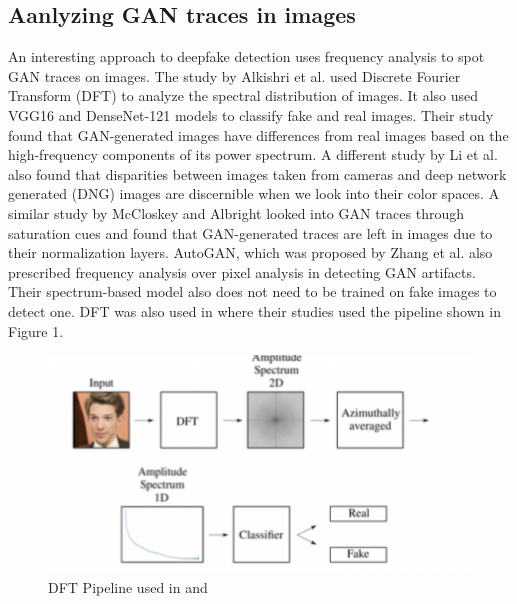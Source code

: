 \documentclass[journal]{./IEEE/IEEEtran}
\begin{document}
\subsection{Aanlyzing GAN traces in images}
An interesting approach to deepfake detection uses frequency analysis to spot GAN traces on images. The study by Alkishri et al. \cite{deepfake-fourier-cnn} used Discrete Fourier Transform (DFT) to analyze the spectral distribution of images. It also used VGG16 and DenseNet-121 models to classify fake and real images. Their study found that GAN-generated images have differences from real images based on the high-frequency components of its power spectrum. A different study by Li et al. \cite{dnn-color-components} also found that disparities between images taken from cameras and deep network generated (DNG) images are discernible when we look into their color spaces. A similar study by McCloskey and Albright \cite{gan-saturation} looked into GAN traces through saturation cues and found that GAN-generated traces are left in images due to their normalization layers. AutoGAN, which was proposed by Zhang et al.\cite{AutoGan} also prescribed frequency analysis over pixel analysis in detecting GAN artifacts. Their spectrum-based model also does not need to be trained on fake images to detect one. DFT was also used in \cite{unmasking} \cite{deepfake-spatio} where their studies used the pipeline shown in Figure 1. 

\begin{figure}[!ht]
    \centering
    \includegraphics{imgs/Screenshot 2023-12-29 at 12.45.10 AM.png}
    \caption{DFT Pipeline used in \cite{unmasking} and \cite{deepfake-spatio}}
    \label{fig:enter-label}
\end{figure}
\end{document}
